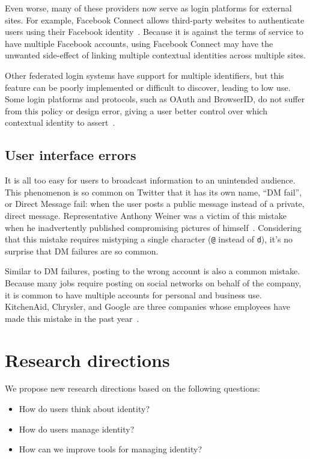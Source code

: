 \documentclass[10pt, conference, compsocconf]{IEEEtran}
\begin{document}
Even worse, many of these providers now serve as login platforms for external
sites. For example, Facebook Connect allows third-party websites to
authenticate users using their Facebook identity~\cite{fb_connect}.  Because it
is against the terms of service to have multiple Facebook accounts, using
Facebook Connect may have the unwanted side-effect of linking multiple
contextual identities across multiple sites.

Other federated login systems have support for multiple identifiers, but this
feature can be poorly implemented or difficult to discover, leading to low use.
Some login platforms and protocols, such as OAuth and BrowserID, do not suffer
from this policy or design error, giving a user better
control over which contextual identity to assert~\cite{browserid,oauth}.

\subsection{User interface errors}
It is all too easy for users to broadcast information to
an unintended audience. This phenomenon is so common on Twitter that it has its
own name, ``DM fail'', or Direct Message fail: when the user posts a public
message instead of a private, direct message. Representative Anthony Weiner was
a victim of this mistake when he inadvertently published compromising pictures
of himself~\cite{weiner}. Considering that this mistake requires
mistyping a single character (\texttt{@} instead of \texttt{d}), it's no
surprise that DM failures are so common.

Similar to DM failures, posting to the wrong account is also a common mistake.
Because many jobs require posting on social networks on behalf of the company,
it is common to have multiple accounts for personal and business use.
KitchenAid, Chrysler, and Google are three companies whose employees have
made this mistake in the past year~\cite{kitchenaid,chrysler,yegge}.

\section{Research directions}
We propose new research directions based on the following questions:
\begin{itemize}
\item How do users think about identity?
\item How do users manage identity?
\item How can we improve tools for managing identity?
\end{itemize}
\end{document}
